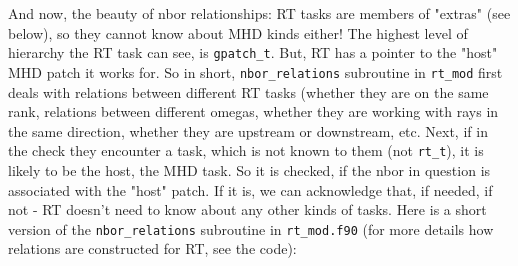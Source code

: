 \documentclass[paper=a4,fontsize=11pt]{scrartcl}
\numberwithin{equation}{section}		%
\numberwithin{figure}{section}			%
\numberwithin{table}{section}				%
\newcommand{\codecolor}{\color{Blue}}
\newcommand{\Code}[1]{{\codecolor\texttt{#1}}}
\begin{document}
And now, the beauty of nbor relationships: RT tasks are members of "extras" (see below), so they cannot know about MHD kinds either! The highest level of hierarchy the RT task can see, is \Code{gpatch\_t}. But, RT has a pointer to the "host" MHD patch it works for. So in short, \Code{nbor\_relations} subroutine in \Code{rt\_mod} first deals with relations between different RT tasks (whether they are on the same rank, relations between different omegas, whether they are working with rays in the same direction, whether they are upstream or downstream, etc. Next, if in the check they encounter a task, which is not known to them (not \Code{rt\_t}), it is likely to be the host, the MHD task. So it is checked, if the nbor in question is associated with the "host" patch. If it is, we can acknowledge that, if needed, if not - RT doesn't need to know about any other kinds of tasks. Here is a short version of the \Code{nbor\_relations} subroutine in \Code{rt\_mod.f90} (for more details how relations are constructed for RT, see the code):
\end{document}
